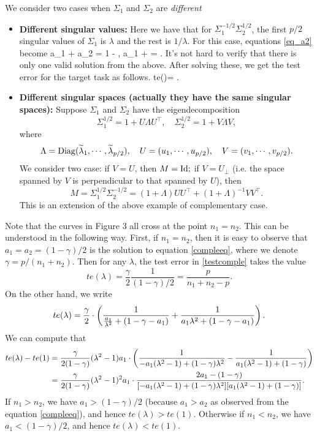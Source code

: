 \smallskip
\begin{example}
	We consider two cases when $\Sigma_1$ and $\Sigma_2$ are \textit{different}
\begin{itemize}
	\item {\bf Different singular values:} Here we have that for $\Sigma_1^{-1/2}\Sigma_2^{1/2}$, the first $p/2$ singular values of $\Sigma_1$ is $\lambda$ and the rest is $1/\lambda$.
For this case, equations \eqref{eq_a2} become
\be\label{compleeq} a_1 + a_2 = 1 - , a_1 + \cdot {} = . \ee
It's not hard to verify that there is only one valid solution from the above.
After solving these, we get the test error for the target task as follows.
\be\label{testcomple} 
te(\lambda)= \cdot {}.\ee
	\item {\bf Different singular spaces {\color{blue}(actually they have the same singular spaces)}:}
	Suppose $\Sigma_1$ and $\Sigma_2$ have the eigendecomposition
$$\Sigma_1^{1/2} = 1+ U\Lambda U^\top, \quad \Sigma_2^{1/2} = 1+ V\Lambda V,$$
where
$$\Lambda = \operatorname{Diag}(\widetilde\lambda_1,\cdots, \widetilde\lambda_{p/2}), \quad U= (u_1,\cdots, u_{p/2}), \quad V= (v_1,\cdots, v_{p/2}).$$
We consider two case: if $V=U$, then $M=\operatorname{Id};$ if $V=U_\perp$ (i.e. the space spanned by $V$ is perpendicular to that spanned by $U$), then
$$M=\Sigma_1^{1/2} \Sigma_2^{-1/2}=(1+\Lambda)UU^\top + (1+\Lambda)^{-1}V V^\top .$$
This is an extension of the above example of complementary case.
\end{itemize}
\end{example}

{\color{blue} Note that the curves in Figure 3 all cross at the point $n_1=n_2$. This can be understood in the following way. 
First, if $n_1=n_2$, then it is easy to observe that $a_1=a_2=(1-\gamma)/2$ is the solution to equation \eqref{compleeq}, where we denote $ \gamma=p/(n_1+n_2)$. Then for any $\lambda$, the test error in \eqref{testcomple} takes the value
$$te(\lambda)= \frac{\gamma}{2}\frac{1}{(1-\gamma)/2}=\frac{p}{n_1+n_2-p}.$$
On the other hand, we write
$$te(\lambda)=\frac{\gamma}{2} \cdot \left({\frac{1}{\frac{a_1}{\lambda^2} + (1-\gamma - a_1)} + \frac{1}{a_1\lambda^2 + (1-\gamma - a_1)}}\right).$$
We can compute that
\begin{align*}
te(\lambda) - te(1)&= \frac{\gamma}{2(1-\gamma)} (\lambda^2-1)a_1\cdot \left({  \frac{1}{ -a_1(\lambda^2-1)+(1-\gamma)\lambda^2 } - \frac{1}{a_1(\lambda^2-1) + (1-\gamma)}}\right) \\
&= \frac{\gamma}{2(1-\gamma)} (\lambda^2-1)^2 a_1\cdot  \frac{2a_1 - (1-\gamma) }{[-a_1(\lambda^2-1)+(1-\gamma)\lambda^2 ][a_1(\lambda^2-1) + (1-\gamma)]} .
\end{align*}
If $n_1>n_2$, we have $a_1>(1-\gamma)/2$ (because $a_1>a_2$ as observed from the equation \eqref{compleeq}), and hence $te(\lambda)>te(1)$. Otherwise if $n_1< n_2$, we have $a_1< (1-\gamma)/2$, and hence $te(\lambda)< te(1)$. 
}

